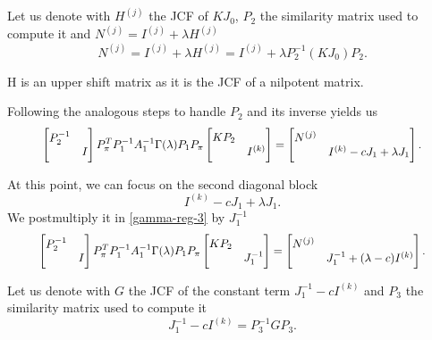 Let us denote with \(H^{(j)}\) the JCF of \(K J_{0}\), \(P_{2}\) the similarity matrix
used to compute it and \(N^{(j)} = I^{(j)} + \lambda H^{(j)}\)
\[
    N^{(j)} = I^{(j)} + \lambda H^{(j)} = I^{(j)} + \lambda P_{2}^{-1} (K J_{0}) P_{2}.
\]

\begin{remark}
    H is an upper shift matrix as it is the JCF of a nilpotent matrix.
\end{remark}

Following the analogous steps to handle \(P_{2}\) and its inverse yields us
\begin{gather}
    \scalemath{0.92}{
        \begin{bmatrix}
            P_{2}^{-1} & \\
            & I
        \end{bmatrix}
        P_{\pi}^T P_{1}^{-1} A_{1}^{-1} \Gamma(\lambda) P_{1} P_{\pi}
        \begin{bmatrix}
            KP_{2} & \\
            & I^{(k)}
        \end{bmatrix} =
        \begin{bmatrix}
            N^{(j)} & \\
            & I^{(k)} - cJ_{1} + \lambda J_{1} 
        \end{bmatrix}. \label{gamma-reg-3}
    }
\end{gather}

At this point, we can focus on the second diagonal block
\[
    I^{(k)} - cJ_{1} + \lambda J_{1}.
\]
We postmultiply it in
\eqref{gamma-reg-3} by \(J_{1}^{-1}\)
\begin{gather}
    \scalemath{0.92}{
        \begin{bmatrix}
            P_{2}^{-1} & \\
            & I
        \end{bmatrix}
        P_{\pi}^T P_{1}^{-1} A_{1}^{-1} \Gamma(\lambda) P_{1} P_{\pi}
        \begin{bmatrix}
            KP_{2} & \\
            & J_{1}^{-1}
        \end{bmatrix} =
        \begin{bmatrix}
            N^{(j)} & \\
            & J_{1}^{-1} + (\lambda - c)I^{(k)} 
        \end{bmatrix}.
    }
\end{gather}

Let us denote with \(G\) the JCF of the constant term \(J_{1}^{-1} - cI^{(k)}\) and \(P_{3}\) the similarity matrix
used to compute it
\[
    J_{1}^{-1} - cI^{(k)} = P_{3}^{-1}GP_{3}.
\]

